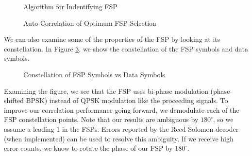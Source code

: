 \documentclass[conference,onecolumn]{IEEEtran}
\begin{document}
\begin{figure}[H]
	\centerline{}
	\caption{Algorithm for Indentifying FSP}
	\label{fig::finding_fsp}
\end{figure}

\begin{figure}[H]
	\centerline{}
	\caption{Auto-Correlation of Optimum FSP Selection}
	\label{fig::fsp_correlation}
\end{figure}

We can also examine some of the properties of the FSP by looking at its constellation. In Figure \ref{fig::fsp_constellation}, we show the constellation of the FSP symbols and data symbols.

\begin{figure}[H]
	\centerline{}
	\caption{Constellation of FSP Symbols vs Data Symbols}
	\label{fig::fsp_constellation}
\end{figure}

Examining the figure, we see that the FSP uses bi-phase modulation (phase-shifted BPSK) instead of QPSK modulation like the proceeding signals. To 
improve our correlation performance going forward, we demodulate each of the FSP constellation points. Note that our results are ambiguous by $180^{\circ}$, so we assume a leading 1 in the FSPs. Errors reported by the Reed Solomon decoder (when implemented) can be used to resolve this ambiguity. If we receive high error counts, we know to rotate the phase of our FSP by $180^{\circ}$.
\end{document}
